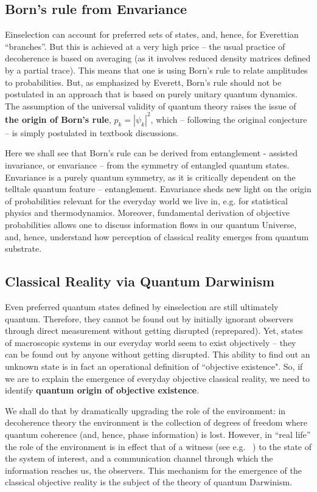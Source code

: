 \documentclass[aps,amsmath,amssymb,amsfonts,floatfix]{revtex4-1}
\newcommand{\+}         {\dagger}
\begin{document}
\subsection{Born's rule from Envariance}

Einselection can account for preferred sets of states, and, hence, for Everettian ``branches''. But this
is achieved at a very high price -- the usual practice of decoherence
is based on averaging (as it involves reduced density matrices defined by a partial trace). This means that
one is using Born's rule to relate amplitudes to probabilities. But, as emphasized by Everett, Born's rule
should not be postulated in an approach that is based on purely unitary quantum dynamics. The assumption of the
universal validity of quantum theory raises the issue of {\bf the origin of Born's rule},
$p_k = |\psi_k|^2$, which -- following the original conjecture \cite{12} -- is simply postulated in textbook discussions.

Here we shall see that Born's rule can be derived from entanglement - assisted invariance, or envariance -- from the symmetry of entangled quantum states. Envariance is a purely quantum symmetry, as it is critically dependent on the telltale quantum feature -- entanglement. Envariance sheds new light on the origin of probabilities relevant for the everyday world we live in, e.g. for statistical physics and thermodynamics. 
Moreover, fundamental derivation of objective probabilities allows one to discuss information flows in our quantum Universe, and, hence, understand how perception of classical reality emerges from quantum substrate.

\subsection{Classical Reality via Quantum Darwinism}

Even preferred quantum states defined by einselection are still ultimately quantum. Therefore, they
cannot be found out by initially ignorant observers through direct measurement without getting
disrupted (reprepared). Yet, states of macroscopic systems in our everyday world seem to exist objectively
-- they can be found out by anyone without getting disrupted. This ability to find out an unknown
state is in fact an operational definition of  ``objective existence". So, if we are to explain the
emergence of everyday objective classical reality, we need to identify {\bf quantum origin of objective existence}.

We shall do that by dramatically upgrading the role of the environment: in decoherence theory the
environment is the collection of degrees of freedom where quantum coherence (and, hence,
phase information) is lost. However, in ``real life'' the role of the environment is in effect that of a witness (see e.g. ~\cite{Z00,75}) to the state of the
system of interest, and a communication channel through which the information
reaches us, the observers. This mechanism for the emergence of the classical objective reality is the subject of the theory of quantum Darwinism.
\end{document}
